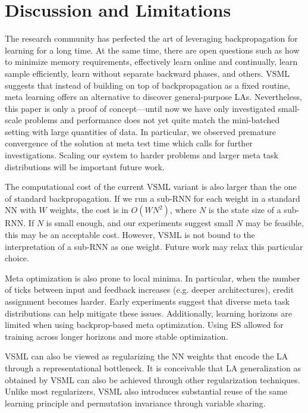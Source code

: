 \documentclass{article}
\newcommand{\principle}{VSML}
\begin{document}
\section{Discussion and Limitations}

The research community has perfected the art of leveraging backpropagation for learning for a long time.
At the same time, there are open questions such as how to minimize memory requirements, effectively learn online and continually, learn sample efficiently, learn without separate backward phases, and others.
{\principle} suggests that instead of building on top of backpropagation as a fixed routine, meta learning offers an alternative to discover general-purpose LAs.
Nevertheless, this paper is only a proof of concept---until now we have only investigated small-scale problems and performance does not yet quite match the mini-batched setting with large quantities of data.
In particular, we observed premature convergence of the solution at meta test time which calls for further investigations.
Scaling our system to harder problems and larger meta task distributions will be important future work.

The computational cost of the current {\principle} variant is also larger than the one of standard backpropagation.
If we run a sub-RNN for each weight in a standard NN with $W$ weights, the cost is in $O(WN^2)$, where $N$ is the state size of a sub-RNN.
If $N$ is small enough, and our experiments suggest small $N$ may be feasible, this may be an acceptable cost.
However, {\principle} is not bound to the interpretation of a sub-RNN as one weight.
Future work may relax this particular choice.

Meta optimization is also prone to local minima.
In particular, when the number of ticks between input and feedback increases (e.g. deeper architectures), credit assignment becomes harder.
Early experiments suggest that diverse meta task distributions can help mitigate these issues.
Additionally, learning horizons are limited when using backprop-based meta optimization.
Using ES allowed for training across longer horizons and more stable optimization.

{\principle} can also be viewed as regularizing the NN weights that encode the LA through a representational bottleneck.
It is conceivable that LA generalization as obtained by {\principle} can also be achieved through other regularization techniques.
Unlike most regularizers, {\principle} also introduces substantial reuse of the same learning principle and permutation invariance through variable sharing.
\end{document}
